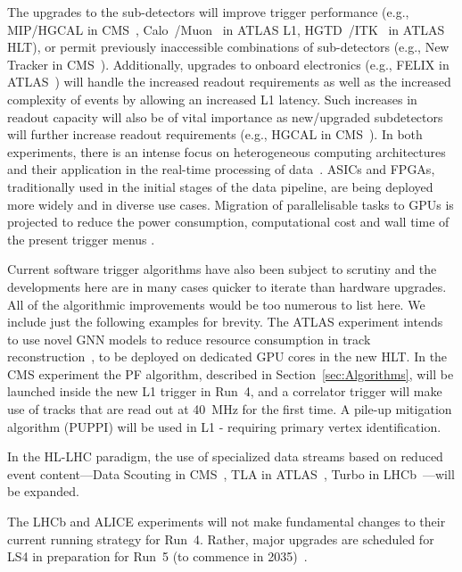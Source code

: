 The upgrades to the sub-detectors will improve trigger performance (e.g., MIP/HGCAL in CMS~\cite{cms2019mip, cms2017phase-hgcal}, Calo~\cite{ATLAS:ECAL, ATLAS:HCAL}/Muon~\cite{ATLAS:Muon} in ATLAS L1, HGTD~\cite{ATLAS:HGTD}/ITK~\cite{ATLAS:ITKPixel, ATLAS:ITKStrip} in ATLAS HLT), or permit previously inaccessible combinations of sub-detectors (e.g., New Tracker in CMS~\cite{collaboration2017phasecms}). Additionally, upgrades to onboard electronics (e.g., FELIX in ATLAS~\cite{ATLAS:FELIX, ATLAS:TDAQ}) will handle the increased readout requirements as well as the increased complexity of events by allowing an increased L1 latency. Such increases in readout capacity will also be of vital importance as new/upgraded subdetectors will further increase readout requirements (e.g., HGCAL in CMS~\cite{cms2017phase-hgcal}).
In both experiments, there is an intense focus on heterogeneous computing architectures and their application in the real-time processing of data~\cite{ATLAS:c-and-s-roadmap,bocci2020heterogeneouscms}. ASICs and FPGAs, traditionally used in the initial stages of the data pipeline, are being deployed more widely and in diverse use cases. Migration of parallelisable tasks to GPUs is projected to reduce the power consumption, computational cost and wall time of the present trigger menus \cite{cms-GPU-clustering}. 

Current software trigger algorithms have also been subject to scrutiny and the developments here are in many cases quicker to iterate than hardware upgrades. All of the algorithmic improvements would be too numerous to list here. We include just the following examples for brevity.
The ATLAS experiment intends to use novel GNN models to reduce resource consumption in track reconstruction~\cite{Murnane:2809518, Caillou:2815578}, to be deployed on dedicated GPU cores in the new HLT.
In the CMS experiment the PF algorithm, described in Section~\ref{sec:Algorithms}, will be launched inside the new L1 trigger in Run~4, and a correlator trigger will make use of tracks that are read out at \SI{40}{MHz} for the first time. A pile-up mitigation algorithm (PUPPI) will be used in L1 - requiring primary vertex identification.

In the HL-LHC paradigm, the use of specialized data streams based on reduced event content—Data Scouting in CMS~\cite{ardino202340cms,tomei2003cms,badaro202040cms}, TLA in ATLAS~\cite{ATLAS:TLA}, Turbo in LHCb~\cite{Aaij:2019uij}—will be expanded.



The LHCb and ALICE experiments will not make fundamental changes to their current running strategy for Run~4. Rather, major upgrades are scheduled for LS4 in preparation for Run~5 (to commence in 2035)~\cite{CERN-LHCC-2021-012, alice_loi_hl_lhc}.
